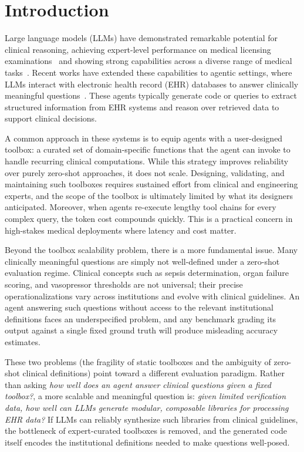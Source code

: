 \section{Introduction}

Large language models (LLMs) have demonstrated remarkable potential for clinical reasoning, achieving expert-level performance on medical licensing examinations~\cite{singhal2023large} and showing strong capabilities across a diverse range of medical tasks~\cite{bedi2025medhelm, wu2025towards, wang2025capabilities}. Recent works have extended these capabilities to agentic settings, where LLMs interact with electronic health record (EHR) databases to answer clinically meaningful questions~\cite{liao2026agentehr, tang2024medagents}. These agents typically generate code or queries to extract structured information from EHR systems and reason over retrieved data to support clinical decisions.

A common approach in these systems is to equip agents with a user-designed toolbox: a curated set of domain-specific functions that the agent can invoke to handle recurring clinical computations. While this strategy improves reliability over purely zero-shot approaches, it does not scale. Designing, validating, and maintaining such toolboxes requires sustained effort from clinical and engineering experts, and the scope of the toolbox is ultimately limited by what its designers anticipated. Moreover, when agents re-execute lengthy tool chains for every complex query, the token cost compounds quickly. This is a practical concern in high-stakes medical deployments where latency and cost matter.

Beyond the toolbox scalability problem, there is a more fundamental issue. Many clinically meaningful questions are simply not well-defined under a zero-shot evaluation regime. Clinical concepts such as sepsis determination, organ failure scoring, and vasopressor thresholds are not universal; their precise operationalizations vary across institutions and evolve with clinical guidelines. An agent answering such questions without access to the relevant institutional definitions faces an underspecified problem, and any benchmark grading its output against a single fixed ground truth will produce misleading accuracy estimates.

These two problems (the fragility of static toolboxes and the ambiguity of zero-shot clinical definitions) point toward a different evaluation paradigm. Rather than asking \emph{how well does an agent answer clinical questions given a fixed toolbox?}, a more scalable and meaningful question is: \emph{given limited verification data, how well can LLMs generate modular, composable libraries for processing EHR data?} If LLMs can reliably synthesize such libraries from clinical guidelines, the bottleneck of expert-curated toolboxes is removed, and the generated code itself encodes the institutional definitions needed to make questions well-posed.

